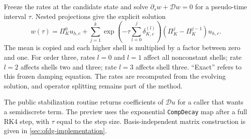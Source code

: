 Freeze the rates at the candidate state and solve
$\partial_s w+\mathcal D w=0$ for a pseudo-time interval $\tau$. Nested
projections give the explicit solution
\begin{equation}
 w(\tau)=\Pi_K^0u_{h,c}+\sum_{j=1}^k
  \exp\!\left(-\tau\sum_{l=0}^j\delta_{K,c}^{(l)}\right)
  (\Pi_K^j-\Pi_K^{j-1})u_{h,c}.
 \label{eq:ofdg-exact-decay}
\end{equation}
The mean is copied and each higher shell is multiplied by a factor between
zero and one. For order three, rates $l=0$ and $l=1$ affect all nonconstant
shells; rate $l=2$ affects shells two and three; rate $l=3$ affects shell three.
``Exact'' refers to this frozen damping equation. The rates are recomputed
from the evolving solution, and operator splitting remains part of the method.

The public stabilization routine returns coefficients of $\mathcal D u$ for
a caller that wants a semidiscrete term. The preview uses the exponential
\texttt{CompDecay} map after a full RK4 step, with $\tau$ equal to the step
size. Basis-independent matrix construction is given in
\cref{sec:ofdg-implementation}.
